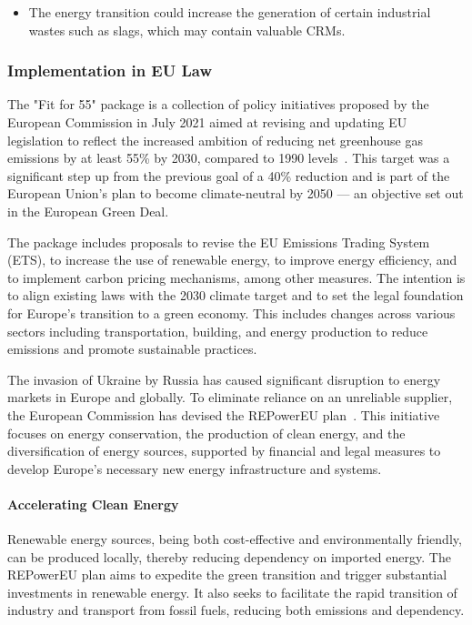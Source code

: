 \wasteSubsubsubsecSLASH
\vspace{-1cm}
\begin{itemize}
    \item The energy transition could increase the generation of certain industrial wastes such as slags, which may contain valuable CRMs.
\end{itemize}

\vspace{\baselineskip}
\subsubsection{Implementation in EU Law}


The "Fit for 55" package is a collection of policy initiatives proposed by the European Commission in July 2021 aimed at revising and updating EU legislation to reflect the increased ambition of reducing net greenhouse gas emissions by at least 55\% by 2030, compared to 1990 levels~\cite{eu2021fitfor55}. This target was a significant step up from the previous goal of a 40\% reduction and is part of the European Union's plan to become climate-neutral by 2050 --- an objective set out in the European Green Deal\cite{eu2019greendeal}.

The package includes proposals to revise the EU Emissions Trading System (ETS), to increase the use of renewable energy, to improve energy efficiency, and to implement carbon pricing mechanisms, among other measures. The intention is to align existing laws with the 2030 climate target and to set the legal foundation for Europe's transition to a green economy. This includes changes across various sectors including transportation, building, and energy production to reduce emissions and promote sustainable practices.


The invasion of Ukraine by Russia has caused significant disruption to energy markets in Europe and globally. To eliminate reliance on an unreliable supplier, the European Commission has devised the REPowerEU plan~\cite{eu2022repower}. This initiative focuses on energy conservation, the production of clean energy, and the diversification of energy sources, supported by financial and legal measures to develop Europe's necessary new energy infrastructure and systems.

\paragraph{Accelerating Clean Energy} Renewable energy sources, being both cost-effective and environmentally friendly, can be produced locally, thereby reducing dependency on imported energy. The REPowerEU plan aims to expedite the green transition and trigger substantial investments in renewable energy. It also seeks to facilitate the rapid transition of industry and transport from fossil fuels, reducing both emissions and dependency.

